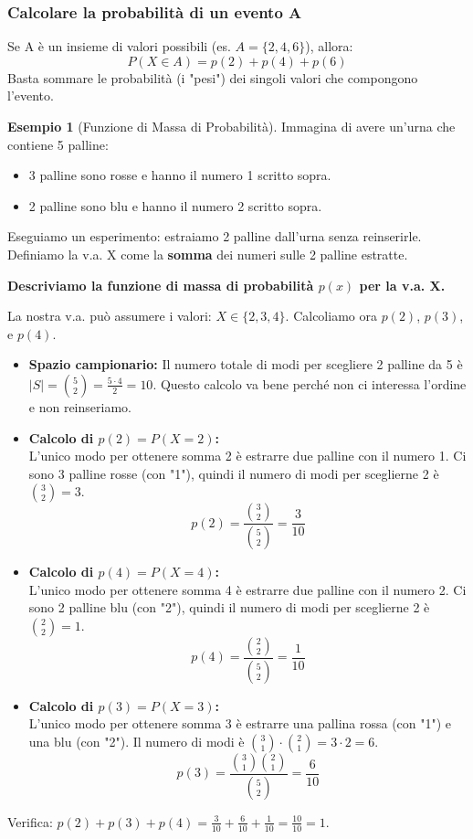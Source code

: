 \documentclass[a4paper, 11pt]{article}
\theoremstyle{definition}
\newtheorem{esempio}{Esempio}[section]
\begin{document}
\subsubsection*{Calcolare la probabilità di un evento A}
Se A è un insieme di valori possibili (es. $A = \{2, 4, 6\}$), allora:
\[ P(X \in A) = p(2) + p(4) + p(6) \]
Basta sommare le probabilità (i "pesi") dei singoli valori che compongono l'evento.

\begin{esempio}[Funzione di Massa di Probabilità]
Immagina di avere un'urna che contiene 5 palline:
\begin{itemize}
    \item 3 palline sono rosse e hanno il numero 1 scritto sopra.
    \item 2 palline sono blu e hanno il numero 2 scritto sopra.
\end{itemize}
Eseguiamo un esperimento: estraiamo 2 palline dall'urna senza reinserirle. \\
Definiamo la v.a. X come la \textbf{somma} dei numeri sulle 2 palline estratte.

\textbf{Descriviamo la funzione di massa di probabilità $p(x)$ per la v.a. X.}

La nostra v.a. può assumere i valori: $X \in \{2, 3, 4\}$.
Calcoliamo ora $p(2)$, $p(3)$, e $p(4)$.

\begin{itemize}
    \item \textbf{Spazio campionario:} Il numero totale di modi per scegliere 2 palline da 5 è $|S| = \binom{5}{2} = \frac{5 \cdot 4}{2} = 10$. Questo calcolo va bene perché non ci interessa l'ordine e non reinseriamo.

    \item \textbf{Calcolo di $p(2) = P(X=2)$:} \\
    L'unico modo per ottenere somma 2 è estrarre due palline con il numero 1. Ci sono 3 palline rosse (con "1"), quindi il numero di modi per sceglierne 2 è $\binom{3}{2} = 3$.
    \[ p(2) = \frac{\binom{3}{2}}{\binom{5}{2}} = \frac{3}{10} \]

    \item \textbf{Calcolo di $p(4) = P(X=4)$:} \\
    L'unico modo per ottenere somma 4 è estrarre due palline con il numero 2. Ci sono 2 palline blu (con "2"), quindi il numero di modi per sceglierne 2 è $\binom{2}{2} = 1$.
    \[ p(4) = \frac{\binom{2}{2}}{\binom{5}{2}} = \frac{1}{10} \]

    \item \textbf{Calcolo di $p(3) = P(X=3)$:} \\
    L'unico modo per ottenere somma 3 è estrarre una pallina rossa (con "1") e una blu (con "2"). Il numero di modi è $\binom{3}{1} \cdot \binom{2}{1} = 3 \cdot 2 = 6$.
    \[ p(3) = \frac{\binom{3}{1}\binom{2}{1}}{\binom{5}{2}} = \frac{6}{10} \]
\end{itemize}
Verifica: $p(2)+p(3)+p(4) = \frac{3}{10} + \frac{6}{10} + \frac{1}{10} = \frac{10}{10} = 1$.
\end{esempio}
\end{document}
